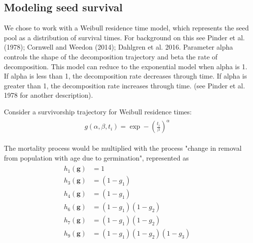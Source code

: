 \documentclass[12pt, oneside, titlepage]{article}   	%
\begin{document}
\clearpage
\newpage


\subsection*{Modeling seed survival}
We chose to work with a Weibull residence time model, which represents the seed pool as a distribution of survival times. For background on this see Pinder et al. (1978); Cornwell and Weedon (2014); Dahlgren et al. 2016. Parameter alpha controls the shape of the decomposition trajectory and beta the rate of decomposition. This model can reduce to the exponential model when alpha is 1. If alpha is less than 1, the decomposition rate decreases through time. If alpha is greater than 1, the decomposition rate increases through time. (see Pinder et al. 1978 for another description).

Consider a survivorship trajectory for Weibull residence times:
%
\begin{align}
  \begin{split}
g(\alpha,\beta,t_i) = \exp-(\frac{t_i}{\beta})^\alpha
  \end{split}
\end{align}

The mortality process would be multiplied with the process "change in removal from population with age due to germination", represented as
%
\begin{align}
  \begin{split}
h_1(\bm{g}) & = 1 \\
h_3(\bm{g}) & = (1-g_1) \\
h_4(\bm{g}) & = (1-g_1) \\
h_6(\bm{g}) & = (1-g_1) (1- g_2) \\
h_7(\bm{g}) & = (1-g_1) (1- g_2) \\
h_9(\bm{g}) & = (1-g_1) (1- g_2) (1-g_3) \\
  \end{split}
\end{align}
% 
\end{document}

